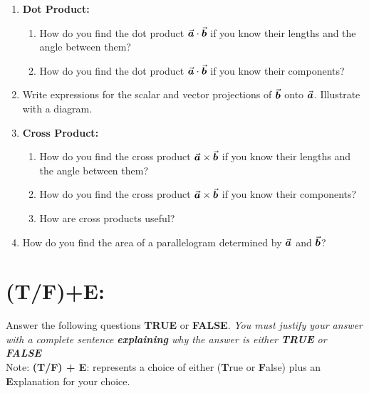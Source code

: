 \begin{enumerate}
\item \textbf{Dot Product:}
\begin{enumerate}
\item How do you find the dot product \(\a\cdot \b\) if you know their lengths and the angle between them?
\item How do you find the dot product \(\a \cdot \b\) if you know their components?
\end{enumerate}


\item Write expressions for the scalar and vector projections of \(\b\) onto \(\a\). Illustrate with a diagram.

\item \textbf{Cross Product:}
\begin{enumerate}
\item How do you find the cross product \(\a\times \b\) if you know their lengths and the angle between them?
\item How do you find the cross product \(\a \times \b\) if you know their components?
\item How are cross products useful?
\end{enumerate}


\item How do you find the area of a parallelogram determined by \(\a\) and \(\b\)?

\end{enumerate}

\pagebreak

\section*{(T/F)+E:}
Answer the following questions \textbf{TRUE} or \textbf{FALSE}.  \emph{You must justify your answer with a complete sentence \textbf{explaining} why the answer is either \textbf{TRUE} or \textbf{FALSE} }\\
Note: \textbf{(T/F) + E}: represents a choice of either (\textbf{T}rue or \textbf{F}alse) plus an \textbf{E}xplanation for your choice.

